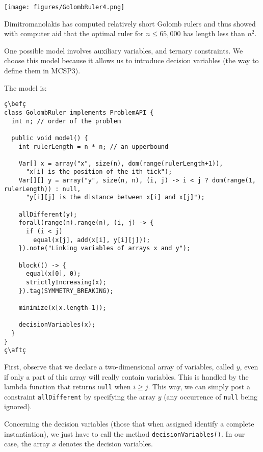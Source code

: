 \documentclass[10pt]{article}
\newcommand{\gb}[1]{{\tt #1}} %
\newcommand{\nn}[1]{{\tt #1}} %
\def\bef{\rule{10cm}{0.1mm}} %
\def\aft{\rule{10cm}{0.1mm}\medskip}
\begin{document}
\begin{center}
\texttt{[image: figures/GolombRuler4.png]} 
\end{center}

Dimitromanolakis has computed relatively short Golomb rulers
and thus showed with computer aid that the optimal ruler for $n \leq 65,000$ has length less than $n^2$.

One possible model involves auxiliary variables, and ternary constraints.
We choose this model because it allows us to introduce decision variables (the way to define them in MCSP3).

The model is:

\begin{lstlisting}
ç\befç
class GolombRuler implements ProblemAPI {
  int n; // order of the problem

  public void model() {
    int rulerLength = n * n; // an upperbound

    Var[] x = array("x", size(n), dom(range(rulerLength+1)),
      "x[i] is the position of the ith tick");
    Var[][] y = array("y", size(n, n), (i, j) -> i < j ? dom(range(1, rulerLength)) : null,
      "y[i][j] is the distance between x[i] and x[j]");
      
    allDifferent(y);
    forall(range(n).range(n), (i, j) -> {
      if (i < j)
        equal(x[j], add(x[i], y[i][j]));
    }).note("Linking variables of arrays x and y");
      
    block(() -> {
      equal(x[0], 0);
      strictlyIncreasing(x);
    }).tag(SYMMETRY_BREAKING);
    
    minimize(x[x.length-1]);

    decisionVariables(x);
  }
}
ç\aftç
\end{lstlisting}

First, observe that we declare a two-dimensional array of variables, called $y$, even if only a part of this array will really contain variables.
This is handled by the lambda function that returns \texttt{null} when $ i \geq j$.
This way, we can simply post a constraint \gb{allDifferent} by specifying the array $y$ (any occurrence of \texttt{null} being ignored).

Concerning the decision variables (those that when assigned identify a complete instantiation), we just have to call the method \nn{decisionVariables()}.
In our case, the array $x$ denotes the decision variables.
\end{document}
